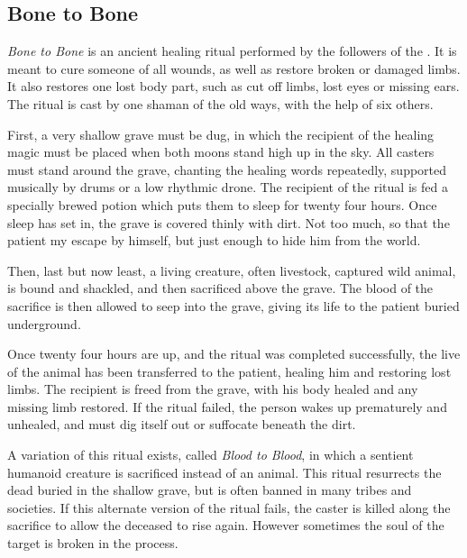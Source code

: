 \subsection{Bone to Bone}
\label{sec:Bone to Bone}


\emph{Bone to Bone} is an ancient healing ritual performed by the followers of
the . It is meant to cure someone of all wounds, as well
as restore broken or damaged limbs. It also restores one lost body part, such
as cut off limbs, lost eyes or missing ears. The ritual is cast by one shaman of
the old ways, with the help of six others.

First, a very shallow grave must be dug, in which the recipient of the healing
magic must be placed when both moons stand high up in the sky. All casters must
stand around the grave, chanting the healing words repeatedly, supported
musically by drums or a low rhythmic drone. The recipient of the ritual is fed
a specially brewed potion which puts them to sleep for twenty four hours. Once
sleep has set in, the grave is covered thinly with dirt. Not too much, so that
the patient my escape by himself, but just enough to hide him from the world.

Then, last but now least, a living creature, often livestock, captured wild
animal, is bound and shackled, and then sacrificed above the grave. The blood
of the sacrifice is then allowed to seep into the grave, giving its life to
the patient buried underground.

Once twenty four hours are up, and the ritual was completed successfully, the
live of the animal has been transferred to the patient, healing him and
restoring lost limbs. The recipient is freed from the grave, with his body
healed and any missing limb restored. If the ritual failed, the person wakes
up prematurely and unhealed, and must dig itself out or suffocate beneath the
dirt.

A variation of this ritual exists, called \emph{Blood to Blood}, in which
a sentient humanoid creature is sacrificed instead of an animal. This ritual
resurrects the dead buried in the shallow grave, but is often banned in many
tribes and societies. If this alternate version of the ritual fails, the
caster is killed along the sacrifice to allow the deceased to rise again.
However sometimes the soul of the target is broken in the process.


